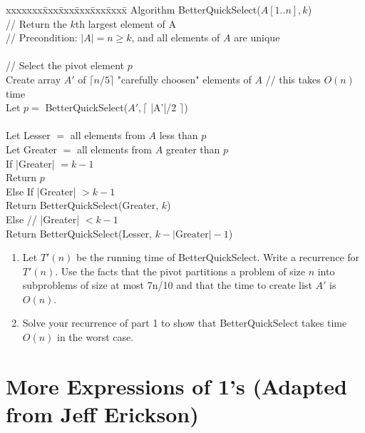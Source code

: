 \documentclass[11pt]{article}
\def\question#1{\red{#1}}
\def\red#1{{\color{red}#1}}
\begin{document}
\begin{tabbing}
xxxxxxx\=xxx\=xxx\=xxx\=xxx\=xxxx\= \kill
\> Algorithm  BetterQuickSelect($A[1..n], k$) \\
\>\> // Return the $k$th largest element of A  \\
\>\> // Precondition: $|A| = n \ge k$, and all elements of $A$ are unique \\ \\

\>\> // Select the pivot element $p$ \\
\>\> Create array $A'$ of $\lceil n/5 \rceil$ "carefully choosen" elements of $A$ // this takes $O(n)$ time \\
\>\> Let $p =$ BetterQuickSelect($A', \lceil$ |A'|/2 $\rceil$) \\ \\
\>\> Let Lesser  $=$ all elements from $A$ less than $p$ \\ 
\>\> Let Greater $=$ all elements from $A$ greater than $p$ \\
\>\> If |Greater| $= k - 1$ \\
\>\>\>  Return $p$ \\
\>\> Else If |Greater| $> k - 1$ \\
\>\>\>  Return BetterQuickSelect(Greater, $k$) \\
\>\> Else  // |Greater| $< k - 1$ \\
\>\>\>  Return BetterQuickSelect(Lesser, $k - |\mbox{Greater}| - 1$)
\end{tabbing}

\begin{enumerate}
\item 
Let $T'(n)$ be the running time of BetterQuickSelect.
\question{Write a recurrence for $T'(n)$.} Use
the facts that the pivot partitions a problem of size $n$ into subproblems of size at most 7n/10
and that the time to create list $A'$ is $O(n)$.

\item \question{Solve your recurrence of part 1 to show that BetterQuickSelect takes time $O(n)$ in the worst case.}
\end{enumerate}

\section{More Expressions of 1's (Adapted from Jeff Erickson)}
\label{sec-3}
\end{document}
